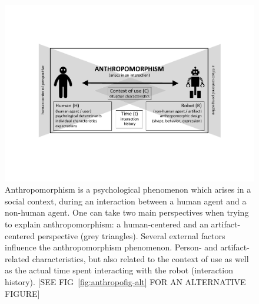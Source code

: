 \documentclass{frontiersSCNS} %
\begin{document}
\begin{figure}
    \centering
    \includegraphics[width=0.75\columnwidth]{anthropo.pdf}
    \caption{Anthropomorphism is a psychological phenomenon which arises in a
        social context, during an interaction between a human agent and a
        non-human agent. One can take two main perspectives when trying to
        explain anthropomorphism: a human-centered and an artifact-centered
        perspective (grey triangles). Several external factors influence the
        anthropomorphism phenomenon. Person- and artifact-related characteristics,
        but also related to the context of use as well as the actual time spent
        interacting with the robot (interaction history). [SEE
        FIG~\ref{fig:anthropofig-alt} FOR AN ALTERNATIVE FIGURE]}

    \label{fig:anthropofig}
\end{figure}

%
%
%
%

%
%
%
%
%
%
\end{document}
